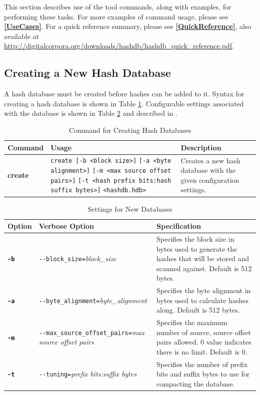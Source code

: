 \documentclass[11pt,fleqn]{article} %
\begin{document}
This section describes use of the \hdb tool commands, along with examples, for performing these tasks.
For more examples of command usage, please see \textbf{\autoref{UseCases}}.
For a \hdb quick reference summary, please see \textbf{\autoref{QuickReference}}, also available at \url{http://digitalcorpora.org/downloads/hashdb/hashdb_quick_reference.pdf}.

\subsection{Creating a New Hash Database}
\label{Creating}
A hash database must be created before hashes can be added to it.
Syntax for creating a hash database is shown in Table \ref{tab:createDatabase}.
Configurable settings associated with the database is shown in Table \ref{tab:hashDBSettings} and described in \textbf{}.\\
\begin{table}[!ht]
\centering
\caption{Command for Creating Hash Databases}
\label{tab:createDatabase}
\begin{tabular}{|p{2.5 cm}|p{7 cm}|p{4 cm}|}
\hline \hline
\textbf{Command} & \textbf{Usage} & \textbf{Description} \\
\hline
\textbf{create} & \verb+create [-b <block size>]+ \verb+[-a <byte alignment>]+ \verb+[-m <max source offset pairs>]+ \verb+[-t <hash prefix bits:hash+ \verb+suffix bytes>]+ \verb+<hashdb.hdb>+ & Creates a new hash database with the given configuration settings.\\
\hline
\end{tabular}
\end{table}

\begin{table}[!ht]
\centering
\caption{Settings for New Databases}
\label{tab:hashDBSettings}
\begin{tabular}{|p{1.5 cm}|p{8 cm}|p{4 cm}|}
\hline \hline
\textbf{Option} & \textbf{Verbose Option} & \textbf{Specification} \\
\hline
\textbf{\texttt{-b}} & \verb+--block_size=+\textit{block\_size} & Specifies the block size in bytes used to generate the hashes that will be stored and scanned against. Default is 512 bytes.  \\
\hline
\textbf{\texttt{-a}} & \verb+--byte_alignment=+\textit{byte\_alignment} & Specifies the byte alignment in bytes used to calculate hashes along. Default is 512 bytes.  \\
\hline
\textbf{\texttt{-m}} & \verb+--max_source_offset_pairs=+\textit{max source offset pairs} & Specifies the maximum number of source, source offset pairs allowed. 0 value indicates there is no limit. Default is 0.\\
\hline
\textbf{\texttt{-t}} & \verb+--tuning=+\textit{prefix bits:suffix bytes} & Specifies the number of prefix bits and suffix bytes to use for compacting the database.\\
\hline
\end{tabular}
\end{table}
\end{document}
